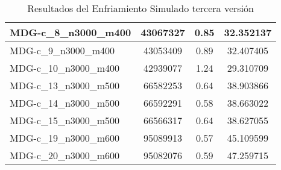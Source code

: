 \documentclass[11pt,a4paper]{article}
\begin{document}
\begin{table}[H]
\begin{center}
\begin{tabular}{|l|c|c|c|}
		MDG-c\_8\_n3000\_m400 & 43067327 & 0.85 & 32.352137 \\ \hline
		MDG-c\_9\_n3000\_m400 & 43053409 & 0.89 & 32.407405 \\ \hline
		MDG-c\_10\_n3000\_m400 & 42939077 & 1.24 & 29.310709 \\ \hline
		MDG-c\_13\_n3000\_m500 & 66582253 & 0.64 & 38.903866 \\ \hline
		MDG-c\_14\_n3000\_m500 & 66592291 & 0.58 & 38.663022 \\ \hline
		MDG-c\_15\_n3000\_m500 & 66566317 & 0.64 & 38.627055 \\ \hline
		MDG-c\_19\_n3000\_m600 & 95089913 & 0.57 & 45.109599 \\ \hline
		MDG-c\_20\_n3000\_m600 & 95082076 & 0.59 & 47.259715 \\ \hline
	\end{tabular}
\end{center}
	\caption{Resultados del Enfriamiento Simulado tercera versión}
	\label{}
\end{table}
\end{document}
